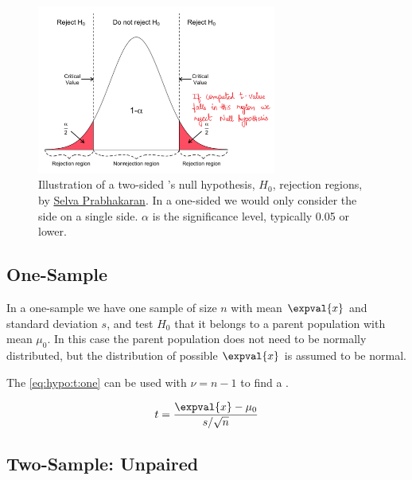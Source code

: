 \begin{figure}
\centering
\includegraphics[width=0.7\textwidth]{figures/hypo/one_side_t_test_rejection_regions.png}
\caption{
Illustration of a two-sided {\ttest}'s null hypothesis, $H_{0}$, rejection regions,
by \href{https://www.machinelearningplus.com/statistics/t-test-students-understanding-the-math-and-how-it-works/}{Selva Prabhakaran}.
In a one-sided \ttest we would only consider the side on a single side.
$\alpha$ is the significance level, typically \num{0.05} or lower.
}
\label{fig:two_sided_t_test}
\end{figure}

\subsection{One-Sample}
\label{hypo:t_test:one}

In a one-sample \ttest we have one sample of size $n$ with mean $\expval{x}$ and standard deviation $s$,
and test $H_{0}$ that it belongs to a parent population with mean $\mu_{0}$.
In this case the parent population does not need to be normally distributed, but the distribution of possible $\expval{x}$ is assumed to be normal.

The \tstat \cref{eq:hypo:t:one} can be used with $\nu = n-1$ to find a \pvalue.

\begin{equation}\label{eq:hypo:t:one}
t = \frac{\expval{x} - \mu_{0}}{s / \sqrt{n}}
\end{equation}

\subsection{Two-Sample: Unpaired}
\label{hypo:t_test:two:unpaired}

